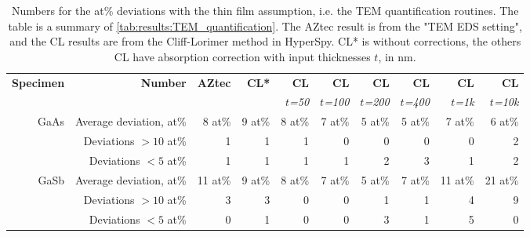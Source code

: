 \begin{table}[phtb]
    \begin{center}
        \caption{
            Numbers for the at\% deviations with the thin film assumption, i.e. the TEM quantification routines.
            The table is a summary of \cref{tab:results:TEM_quantification}.
            The AZtec result is from the "TEM EDS setting", and the CL results are from the Cliff-Lorimer method in HyperSpy.
            CL* is without corrections, the others CL have absorption correction with input thicknesses $t$, in nm.
        }
        \label{tab:results:TEM_quantification_stats}
        \begin{tabular}{rrrrrrrrrr}
            \hline
            \textbf{Specimen} & \textbf{Number}         & \textbf{AZtec} & \textbf{CL*} & \textbf{CL}   & \textbf{CL}    & \textbf{CL}    & \textbf{CL}    & \textbf{CL}   & \textbf{CL}    \\
            \emph{}           & \emph{}                 & \emph{}        & \emph{}      & \emph{$t$=50} & \emph{$t$=100} & \emph{$t$=200} & \emph{$t$=400} & \emph{$t$=1k} & \emph{$t$=10k} \\
            \hline
            GaAs              & Average deviation, at\% & 8 at\%         & 9 at\%       & 8 at\%        & 7 at\%         & 5 at\%         & 5 at\%         & 7 at\%        & 6 at\%         \\
                              & Deviations $>10$ at\%   & 1              & 1            & 1             & 0              & 0              & 0              & 0             & 2              \\
                              & Deviations  $<5$  at\%  & 1              & 1            & 1             & 1              & 2              & 3              & 1             & 2              \\
            \hline
            GaSb              & Average deviation, at\% & 11 at\%        & 9 at\%       & 8 at\%        & 7 at\%         & 5 at\%         & 7 at\%         & 11 at\%       & 21 at\%        \\
                              & Deviations $>10$ at\%   & 3              & 3            & 0             & 0              & 1              & 1              & 4             & 9              \\
                              & Deviations  $<5$  at\%  & 0              & 1            & 0             & 0              & 3              & 1              & 5             & 0              \\
            \hline
        \end{tabular}
    \end{center}
\end{table}

